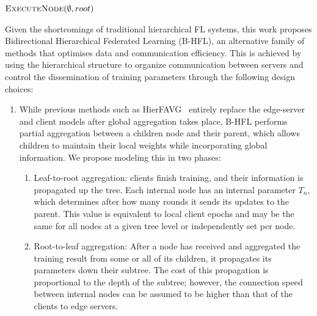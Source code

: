\begin{algorithm}[H]
\begin{onehalfspace}
\begin{algorithmic}[1]
            \State $\Call{ExecuteNode}{\emptyset, root}$
        \end{algorithmic}
    \end{onehalfspace}
\end{algorithm}



Given the shortcomings of traditional hierarchical FL systems, this work proposes Bidirectional Hierarchical Federated Learning (B-HFL), an alternative family of methods that optimises data and communication efficiency. This is achieved by using the hierarchical structure to organize communication between servers and control the dissemination of training parameters through the following design choices:

\begin{enumerate}
    \item While previous methods such as HierFAVG~\citep{Client-Edge-CloudHierFL,Hier_Het_Cellular} entirely replace the edge-server and client models after global aggregation takes place, B-HFL performs partial aggregation between a children node and their parent, which allows children to maintain their local weights while incorporating global information. We propose modeling this in two phases:

          \begin{enumerate}
              \item Leaf-to-root aggregation: clients finish training, and their information is propagated up the tree. Each internal node has an internal parameter $T_n$, which determines after how many rounds it sends its updates to the parent. This value is equivalent to local client epochs and may be the same for all nodes at a given tree level or independently set per node.
              \item Root-to-leaf aggregation: After a node has received and aggregated the training result from some or all of its children, it propagates its parameters down their subtree. The cost of this propagation is proportional to the depth of the subtree; however, the connection speed between internal nodes can be assumed to be higher than that of the clients to edge servers.
          \end{enumerate}


\end{enumerate}
